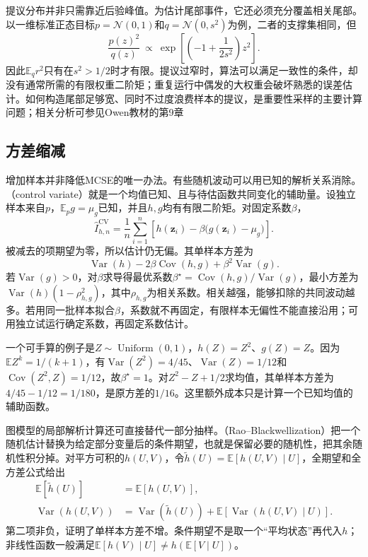 提议分布并非只需靠近后验峰值。为估计尾部事件，它还必须充分覆盖相关尾部。以一维标准正态目标$p=\mathcal{N}(0,1)$和$q=\mathcal{N}(0,s^2)$为例，二者的支撑集相同，但
\[
  \frac{p(z)^2}{q(z)}
    \ \propto\ \exp\left[\left(-1+\frac{1}{2s^2}\right)z^2\right].
\]
因此$\mathbb{E}_q r^2$只有在$s^2>1/2$时才有限。提议过窄时，算法可以满足一致性的条件，却没有通常所需的有限权重二阶矩；重复运行中偶发的大权重会破坏熟悉的误差估计。如何构造尾部足够宽、同时不过度浪费样本的提议，是重要性采样的主要计算问题；相关分析可参见Owen教材的第9章

\subsection{方差缩减}
\label{sec:pgm-sampling-variance-reduction}

增加样本并非降低MCSE的唯一办法。有些随机波动可以用已知的解析关系消除。（control variate）就是一个均值已知、且与待估函数共同变化的辅助量。设独立样本来自$p$，$\mathbb{E}_p g=\mu_g$已知，并且$h,g$均有有限二阶矩。对固定系数$\beta$，
\begin{equation}
  \widehat I_{h,n}^{\mathrm{CV}}
    =\frac{1}{n}\sum_{i=1}^{n}
      \left[h(\bm{z}_i)-\beta\bigl(g(\bm{z}_i)-\mu_g\bigr)\right].
  \label{eq:pgm-sampling-control}
\end{equation}
被减去的项期望为零，所以估计仍无偏。其单样本方差为
\[
  \operatorname{Var}(h)-2\beta\operatorname{Cov}(h,g)
    +\beta^2\operatorname{Var}(g).
\]
若$\operatorname{Var}(g)>0$，对$\beta$求导得最优系数$\beta^\star=\operatorname{Cov}(h,g)/\operatorname{Var}(g)$，最小方差为$\operatorname{Var}(h)(1-\rho_{h,g}^2)$，其中$\rho_{h,g}$为相关系数。相关越强，能够扣除的共同波动越多。若用同一批样本拟合$\beta$，系数就不再固定，有限样本无偏性不能直接沿用；可用独立试运行确定系数，再固定系数估计。

一个可手算的例子是$Z\sim\operatorname{Uniform}(0,1)$，$h(Z)=Z^2$、$g(Z)=Z$。因为$\mathbb{E}Z^k=1/(k+1)$，有$\operatorname{Var}(Z^2)=4/45$、$\operatorname{Var}(Z)=1/12$和$\operatorname{Cov}(Z^2,Z)=1/12$，故$\beta^\star=1$。对$Z^2-Z+1/2$求均值，其单样本方差为$4/45-1/12=1/180$，是原方差的$1/16$。这里额外成本只是计算一个已知均值的辅助函数。

图模型的局部解析计算还可直接替代一部分抽样。（Rao--Blackwellization）把一个随机估计替换为给定部分变量后的条件期望，也就是保留必要的随机性，把其余随机性积分掉。对平方可积的$h(U,V)$，令$\widetilde h(U)=\mathbb{E}[h(U,V)\mid U]$，全期望和全方差公式给出
\begin{equation}
  \begin{aligned}
    \mathbb{E}[\widetilde h(U)]&=\mathbb{E}[h(U,V)],\\
    \operatorname{Var}(h(U,V))
      &=\operatorname{Var}(\widetilde h(U))
        +\mathbb{E}[\operatorname{Var}(h(U,V)\mid U)].
  \end{aligned}
  \label{eq:pgm-sampling-rao-blackwell}
\end{equation}
第二项非负，证明了单样本方差不增。条件期望不是取一个“平均状态”再代入$h$；非线性函数一般满足$\mathbb{E}[h(V)\mid U]\ne h(\mathbb{E}[V\mid U])$。

